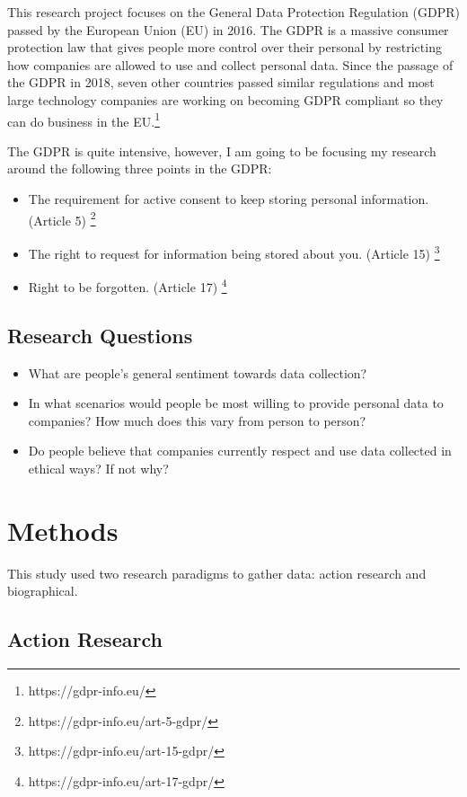 \documentclass[12pt,
 reprint,
nofootinbib,
 amsmath,amssymb,
 aps,
]{revtex4-2}
\begin{document}
This research project focuses on the General Data Protection Regulation (GDPR) passed by the European Union (EU) in 2016. 
The GDPR is a massive consumer protection law that gives people more control over their personal by restricting how companies are allowed to use and collect personal data. 
Since the passage of the GDPR in 2018, seven other countries passed similar regulations and most large technology companies are working on becoming GDPR compliant so they can do business in the EU.\footnote{https://gdpr-info.eu/}

The GDPR is quite intensive, however, I am going to be focusing my research around the following three points in the GDPR:
\begin{itemize}
    \item The requirement for active consent to keep storing personal information. (Article 5) \footnote{https://gdpr-info.eu/art-5-gdpr/}
    \item The right to request for information being stored about you. (Article 15) \footnote{https://gdpr-info.eu/art-15-gdpr/}
    \item Right to be forgotten. (Article 17) \footnote{https://gdpr-info.eu/art-17-gdpr/}
\end{itemize}

\subsection{\label{sec:level2}Research Questions}

\begin{itemize}
    \item What are people’s general sentiment towards data collection?
    \item In what scenarios would people be most willing to provide personal data to companies?  How much does this vary from person to person?
    \item Do people believe that companies currently respect and use data collected in ethical ways? If not why?
\end{itemize}


\section{\label{sec:level1}Methods}

This study used two research paradigms to gather data: action research and biographical.

\subsection{\label{sec:level2}Action Research}
\end{document}
